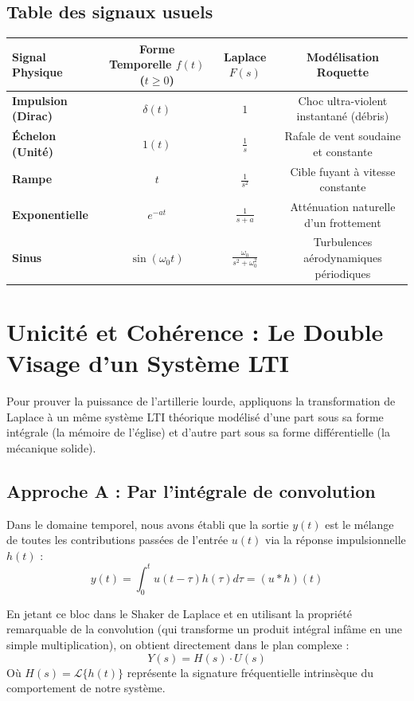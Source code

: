 \documentclass[11pt,a4paper]{report}
\begin{document}
\subsection{Table des signaux usuels}
\begin{center}
\small
\begin{tabular}{|l|c|c|c|}
\hline
\textbf{Signal Physique} & \textbf{Forme Temporelle} $f(t)$ ($t \ge 0$) & \textbf{Laplace} $F(s)$ & \textbf{Modélisation Roquette} \\ \hline
\textbf{Impulsion (Dirac)} & $\delta(t)$ & $1$ & Choc ultra-violent instantané (débris) \\ \hline
\textbf{Échelon (Unité)} & $1(t)$ & $\frac{1}{s}$ & Rafale de vent soudaine et constante \\ \hline
\textbf{Rampe} & $t$ & $\frac{1}{s^2}$ & Cible fuyant à vitesse constante \\ \hline
\textbf{Exponentielle} & $e^{-at}$ & $\frac{1}{s + a}$ & Atténuation naturelle d'un frottement \\ \hline
\textbf{Sinus} & $\sin(\omega_0 t)$ & $\frac{\omega_0}{s^2 + \omega_0^2}$ & Turbulences aérodynamiques périodiques \\ \hline
\end{tabular}
\end{center}

\section{Unicité et Cohérence : Le Double Visage d'un Système LTI}

Pour prouver la puissance de l'artillerie lourde, appliquons la transformation de Laplace à un même système LTI théorique modélisé d'une part sous sa forme intégrale (la mémoire de l'église) et d'autre part sous sa forme différentielle (la mécanique solide).

\subsection{Approche A : Par l'intégrale de convolution}
Dans le domaine temporel, nous avons établi que la sortie $y(t)$ est le mélange de toutes les contributions passées de l'entrée $u(t)$ via la réponse impulsionnelle $h(t)$ :
\[ y(t) = \int_{0}^{t} u(t-\tau)h(\tau)d\tau = (u * h)(t) \]

En jetant ce bloc dans le Shaker de Laplace et en utilisant la propriété remarquable de la convolution (qui transforme un produit intégral infâme en une simple multiplication), on obtient directement dans le plan complexe :
\[ Y(s) = H(s) \cdot U(s) \]
Où $H(s) = \mathcal{L}\{h(t)\}$ représente la signature fréquentielle intrinsèque du comportement de notre système.
\end{document}
